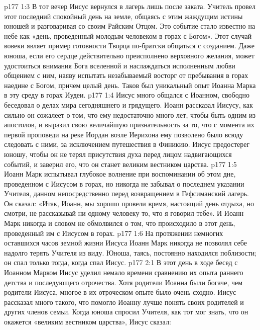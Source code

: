 \vs p177 1:3 В тот вечер Иисус вернулся в лагерь лишь после заката. Учитель провел этот последний спокойный день на земле, общаясь с этим жаждущим истины юношей и разговаривая со своим Райским Отцом. Это событие стало известно на небе как «день, проведенный молодым человеком в горах с Богом». Этот случай вовеки являет пример готовности Творца по\hyp{}братски общаться с созданием. Даже юноша, если его сердце действительно преисполнено верховного желания, может удостоиться внимания Бога вселенной и наслаждаться исполненным любви общением с ним, наяву испытать незабываемый восторг от пребывания в горах наедине с Богом, причем целый день. Таков был уникальный опыт Иоанна Марка в эту среду в горах Иудеи.
\vs p177 1:4 Иисус много общался с Иоанном, свободно беседовал о делах мира сегодняшнего и грядущего. Иоанн рассказал Иисусу, как сильно он сожалеет о том, что ему недостаточно много лет, чтобы быть одним из апостолов, и выразил свою величайшую признательность за то, что с момента их первой проповеди на реке Иордан возле Иерихона ему позволено было всюду следовать с ними, за исключением путешествия в Финикию. Иисус предостерег юношу, чтобы он не терял присутствия духа перед лицом надвигающихся событий, и заверил его, что он станет великим вестником царства.
\vs p177 1:5 Иоанн Марк испытывал глубокое волнение при воспоминании об этом дне, проведенном с Иисусом в горах, но никогда не забывал о последнем указании Учителя, данном непосредственно перед возвращением в Гефсиманский лагерь. Он сказал: «Итак, Иоанн, мы хорошо провели время, настоящий день отдыха, но смотри, не рассказывай ни одному человеку то, что я говорил тебе». И Иоанн Марк никогда и словом не обмолвился о том, что происходило в этот день, проведенный им с Иисусом в горах.
\vs p177 1:6 На протяжении немногих оставшихся часов земной жизни Иисуса Иоанн Марк никогда не позволял себе надолго терять Учителя из виду. Юноша, таясь, постоянно находился поблизости; он спал только тогда, когда спал Иисус.
\vs p177 2:1 В этот день в ходе бесед с Иоанном Марком Иисус уделил немало времени сравнению их опыта раннего детства и последующего отрочества. Хотя родители Иоанна были богаче, чем родители Иисуса, многое в их отроческом опыте было очень сходно. Иисус рассказал много такого, что помогло Иоанну лучше понять своих родителей и других членов семьи. Когда юноша спросил Учителя, как тот мог знать, что он окажется «великим вестником царства», Иисус сказал:
